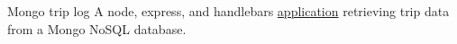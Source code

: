 \datedsubsection{}
{Mongo trip log}
{}
{A node, express, and handlebars \href{https://github.com/jacobarchambault/mongotripdata}{application} retrieving trip data from a Mongo NoSQL database.}
